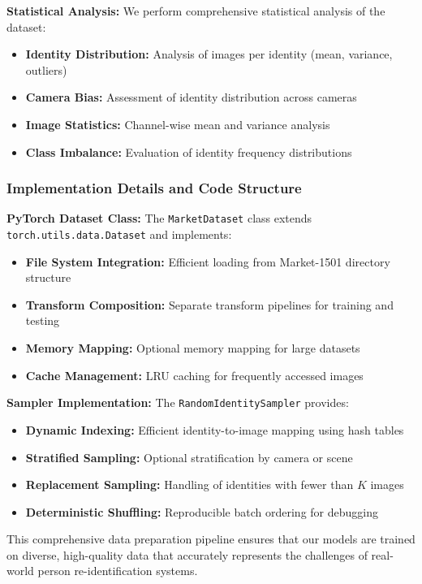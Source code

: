 \documentclass[a4paper,12pt]{article}
\begin{document}
\textbf{Statistical Analysis:}
We perform comprehensive statistical analysis of the dataset:
\begin{itemize}
    \item \textbf{Identity Distribution:} Analysis of images per identity (mean, variance, outliers)
    \item \textbf{Camera Bias:} Assessment of identity distribution across cameras
    \item \textbf{Image Statistics:} Channel-wise mean and variance analysis
    \item \textbf{Class Imbalance:} Evaluation of identity frequency distributions
\end{itemize}

\subsubsection{Implementation Details and Code Structure}

\textbf{PyTorch Dataset Class:}
The \texttt{MarketDataset} class extends \texttt{torch.utils.data.Dataset} and implements:
\begin{itemize}
    \item \textbf{File System Integration:} Efficient loading from Market-1501 directory structure
    \item \textbf{Transform Composition:} Separate transform pipelines for training and testing
    \item \textbf{Memory Mapping:} Optional memory mapping for large datasets
    \item \textbf{Cache Management:} LRU caching for frequently accessed images
\end{itemize}

\textbf{Sampler Implementation:}
The \texttt{RandomIdentitySampler} provides:
\begin{itemize}
    \item \textbf{Dynamic Indexing:} Efficient identity-to-image mapping using hash tables
    \item \textbf{Stratified Sampling:} Optional stratification by camera or scene
    \item \textbf{Replacement Sampling:} Handling of identities with fewer than $K$ images
    \item \textbf{Deterministic Shuffling:} Reproducible batch ordering for debugging
\end{itemize}

This comprehensive data preparation pipeline ensures that our models are trained on diverse, high-quality data that accurately represents the challenges of real-world person re-identification systems.
\end{document}
